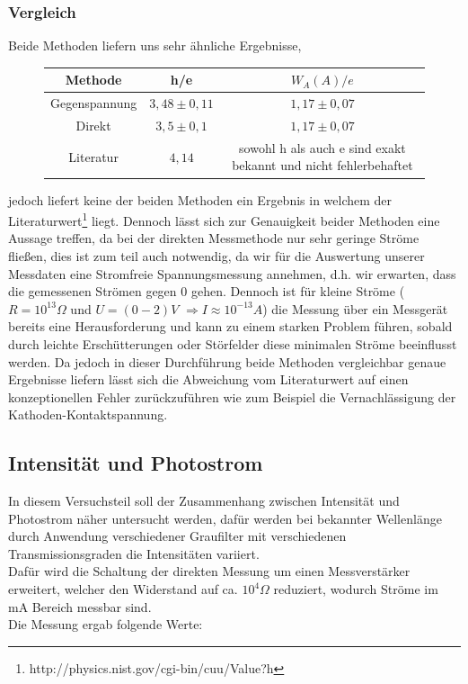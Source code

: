 \documentclass{scrartcl}
\begin{document}
		\subsubsection{Vergleich}
			Beide Methoden liefern uns sehr ähnliche Ergebnisse,
			\begin{figure}[H]
				\centering
				\begin{tabular}{|c|c|c|}
					\hline
					Methode & h/e & $W_A(A)/e$ \\ 
					\hline
					Gegenspannung & $3,48\pm 0,11$ & $1,17\pm 0,07$ \\
					Direkt & $3,5\pm 0,1$ & $1,17\pm 0,07$ \\
					Literatur & $4,14$ & sowohl h als auch e sind exakt bekannt und nicht fehlerbehaftet \\
					\hline
				\end{tabular}
			\end{figure}
			jedoch liefert keine der beiden Methoden ein Ergebnis in welchem der Literaturwert\footnote{http://physics.nist.gov/cgi-bin/cuu/Value?h} liegt. Dennoch lässt sich 
			zur Genauigkeit beider Methoden eine Aussage treffen, da bei der direkten Messmethode nur sehr geringe Ströme fließen, dies ist zum teil auch notwendig,
			da wir für die Auswertung unserer Messdaten eine Stromfreie Spannungsmessung annehmen, d.h. wir erwarten, dass die gemessenen Strömen gegen 0 gehen.
			Dennoch ist für kleine Ströme
			($R=10^{13}\Omega$ und $U=(0-2)V$ $\Rightarrow I\approx 10^{-13}A$) die Messung über ein Messgerät bereits eine Herausforderung
			und kann zu einem starken Problem führen, sobald durch leichte Erschütterungen oder Störfelder diese minimalen Ströme beeinflusst werden.
			Da jedoch in dieser Durchführung beide Methoden vergleichbar genaue Ergebnisse liefern lässt sich die Abweichung vom 
			Literaturwert auf einen konzeptionellen Fehler zurückzuführen wie zum Beispiel die Vernachlässigung der Kathoden-Kontaktspannung.

	\subsection{Intensität und Photostrom}
		In diesem Versuchsteil soll der Zusammenhang zwischen Intensität und Photostrom näher untersucht werden, dafür 
		werden bei bekannter Wellenlänge durch Anwendung verschiedener Graufilter mit verschiedenen Transmissionsgraden
		die Intensitäten variiert.\\
		Dafür wird die Schaltung der direkten Messung um einen Messverstärker erweitert, welcher den Widerstand
		auf ca. $10^4 \Omega$ reduziert, wodurch Ströme im mA Bereich messbar sind.\\
		Die Messung ergab folgende Werte:
		
\end{document}
